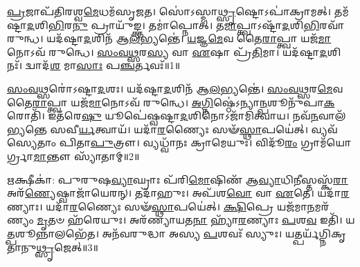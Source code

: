 \clearpage
{}
\setcounter{anuvakam}{0}

\-\ul{𑌪𑍍𑌰}\-𑌜𑌾𑌪᳴𑌤𑌿𑌰𑌶𑍍𑌵\-\ul{𑌮𑍇}\-𑌧𑌮᳴\-𑌸𑍃𑌜𑌤।
𑌸𑍋॑𑌽𑌸𑍍𑌮𑌾\-\ul{𑌥𑍍𑌸𑍃}\-𑌷𑍍𑌟𑍋\-𑌽𑌪𑌾॑𑌕𑍍𑌰𑌾𑌮𑌤𑍍।
𑌤𑌮᳴𑌷𑍍𑌟𑌾\-\ul{𑌦}\-𑌶𑌿\-\ul{𑌭𑌿}\-𑌰\-\ul{𑌨𑍁}\- 𑌪𑍍𑌰𑌾𑌯𑍁᳴𑌙𑍍𑌕𑍍𑌤।
𑌤𑌮𑌾॑𑌪𑍍𑌨𑍋𑌤𑍍।
𑌤\-\ul{𑌮𑌾}\-𑌪𑍍𑌤𑍍𑌵𑌾\-𑌽𑌷𑍍𑌟𑌾᳴\-\ul{𑌦}\-𑌶𑌿\-\ul{𑌭𑌿}\-𑌰𑌵𑌾᳴\-𑌰𑍁𑌨𑍍𑌧।
𑌯𑌦᳴𑌷𑍍𑌟𑌾\-\ul{𑌦}\-𑌶𑌿𑌨᳴ 𑌆\-\ul{𑌲}\-𑌭𑍍𑌯𑌨𑍍𑌤𑍇॑।
\-\ul{𑌯}\-𑌜𑍍𑌞\-\ul{𑌮𑍇}\-𑌵 𑌤𑍈\-\ul{𑌰𑌾}\-𑌪𑍍𑌤𑍍𑌵𑌾 𑌯𑌜᳴\-\ul{𑌮𑌾}\-𑌨𑍋\-𑌽𑌵᳴ 𑌰𑍁𑌨𑍍𑌧𑍇।
\-\ul{𑌸𑌂}\-\-\ul{𑌵}\-\-\ul{𑌥𑍍𑌸}\-𑌰\-\ul{𑌸𑍍𑌯} 𑌵𑌾 \ul{𑌏}\-𑌷𑌾 𑌪𑍍𑌰᳴\-\ul{𑌤𑌿}\-𑌮𑌾।
𑌯𑌦᳴𑌷𑍍𑌟𑌾\-\ul{𑌦}\-𑌶𑌿𑌨𑌃᳴।
𑌦𑍍𑌵𑌾𑌦᳴\-\ul{𑌶} 𑌮𑌾\-\ul{𑌸𑌾𑌃} 𑌪\-\ul{𑌞𑍍𑌚}\-𑌰𑍍𑌤𑌵𑌃᳴॥1॥

\-\ul{𑌸𑌂}\-\-\ul{𑌵}\-\-\ul{𑌥𑍍𑌸}\-𑌰𑍋॑\-𑌽𑌷𑍍𑌟𑌾\-\ul{𑌦}\-𑌶𑌃।
𑌯𑌦᳴𑌷𑍍𑌟𑌾\-\ul{𑌦}\-𑌶𑌿𑌨᳴ 𑌆\-\ul{𑌲}\-𑌭𑍍𑌯𑌨𑍍𑌤𑍇॑।
\-\ul{𑌸𑌂}\-\-\ul{𑌵}\-\-\ul{𑌥𑍍𑌸}\-𑌰\-\ul{𑌮𑍇}\-𑌵 𑌤𑍈\-\ul{𑌰𑌾}\-𑌪𑍍𑌤𑍍𑌵𑌾 𑌯𑌜᳴\-\ul{𑌮𑌾}\-𑌨𑍋\-𑌽𑌵᳴ 𑌰𑍁𑌨𑍍𑌧𑍇।
\-\ul{𑌅}\-\-\ul{𑌗𑍍𑌨𑌿}\-𑌷𑍍𑌠𑍇॑\-𑌽𑌨𑍍𑌯𑌾\-\ul{𑌨𑍍𑌪}\-𑌶𑍂𑌨𑍁᳴𑌪𑌾\-\ul{𑌕}\-𑌰𑍋𑌤𑌿᳴।
𑌇𑌤᳴𑌰𑍇\-\ul{𑌷𑍁} 𑌯𑍂𑌪𑍇॑𑌷𑍍𑌵𑌷𑍍𑌟𑌾\-\ul{𑌦}\-𑌶𑌿𑌨𑍋\-𑌽𑌜𑌾᳴𑌮𑌿𑌤𑍍𑌵𑌾𑌯।
𑌨𑌵᳴\-\ul{𑌨}\-𑌵𑌾𑌲᳴𑌭𑍍𑌯𑌨𑍍𑌤𑍇 𑌸𑌵𑍀\-\ul{𑌰𑍍𑌯}\-𑌤𑍍𑌵𑌾𑌯᳴।
𑌯𑌦𑌾᳴\-\ul{𑌰}\-𑌣𑍍𑌯𑍈𑌃 𑌸𑍟᳴\-\ul{𑌸𑍍𑌥𑌾}\-𑌪𑌯𑍇॑𑌤𑍍।
𑌵𑍍𑌯𑌵᳴𑌸𑍍𑌯𑍇𑌤𑌾𑌂 𑌪𑌿𑌤𑌾\-\ul{𑌪𑍁}\-𑌤𑍍𑌰𑍗।
𑌵𑍍𑌯𑌧𑍍𑌵𑌾᳴𑌨𑌃 𑌕𑍍𑌰𑌾𑌮𑍇𑌯𑍁𑌃।
𑌵𑌿𑌦𑍂᳴\-\ul{𑌰𑌂} 𑌗𑍍𑌰𑌾𑌮᳴𑌯𑍋𑌰𑍍𑌗𑍍𑌰𑌾\-\ul{𑌮𑌾}\-𑌨𑍍𑌤𑍗 𑌸𑍍𑌯𑌾᳴𑌤𑌾𑌮𑍍॥2॥

\-\ul{𑌋}\-𑌕𑍍𑌷𑍀𑌕𑌾॑: 𑌪𑍁𑌰𑍁𑌷\-\ul{𑌵𑍍𑌯𑌾}\-𑌘𑍍𑌰𑌾𑌃 𑌪᳴𑌰𑌿\-\ul{𑌮𑍋}\-𑌷𑌿𑌣᳴ 𑌆\-\ul{𑌵𑍍𑌯𑌾}\-𑌧𑌿\-\ul{𑌨𑍀}\-𑌸𑍍𑌤𑌸𑍍𑌕᳴\-\ul{𑌰𑌾} 𑌅𑌰᳴\-\ul{𑌣𑍍𑌯𑍇}\-𑌷𑍍𑌵𑌾𑌜𑌾᳴𑌯𑍇𑌰𑌨𑍍।
𑌤𑌦𑌾᳴𑌹𑍁𑌃।
𑌅𑌪᳴𑌶\-\ul{𑌵𑍋} 𑌵𑌾 \ul{𑌏}\-𑌤𑍇।
𑌯𑌦𑌾᳴\-\ul{𑌰}\-𑌣𑍍𑌯𑌾𑌃।
𑌯𑌦𑌾᳴\-\ul{𑌰}\-𑌣𑍍𑌯𑍈𑌃 𑌸𑍟᳴\-\ul{𑌸𑍍𑌥𑌾}\-𑌪𑌯𑍇॑𑌤𑍍।
\-\ul{𑌕𑍍𑌷𑌿}\-𑌪𑍍𑌰𑍇 𑌯𑌜᳴𑌮𑌾\-\ul{𑌨}\-𑌮𑌰᳴𑌣𑍍𑌯𑌂 \ul{𑌮𑍃}\-𑌤𑍞 𑌹᳴𑌰𑍇𑌯𑍁𑌃।
𑌅𑌰᳴𑌣𑍍𑌯𑌾𑌯𑌤\-\ul{𑌨𑌾} 𑌹𑍍𑌯𑌾᳴\-\ul{𑌰}\-𑌣𑍍𑌯𑌾𑌃 \ul{𑌪}\-𑌶\-\ul{𑌵} 𑌇𑌤𑌿᳴।
𑌯\-\ul{𑌤𑍍𑌪}\-𑌶𑍂𑌨𑍍𑌨𑌾𑌲𑌭𑍇᳴𑌤।
𑌅𑌨᳴𑌵𑌰𑍁𑌦𑍍𑌧𑌾 𑌅𑌸𑍍𑌯 \ul{𑌪}\-𑌶𑌵𑌃᳴ 𑌸𑍍𑌯𑍁𑌃।
𑌯𑌤𑍍𑌪𑌰𑍍𑌯᳴𑌗𑍍𑌨𑌿𑌕𑍃𑌤𑌾𑌨𑍁\-\ul{𑌥𑍍𑌸𑍃}\-𑌜𑍇𑌤𑍍॥3॥

